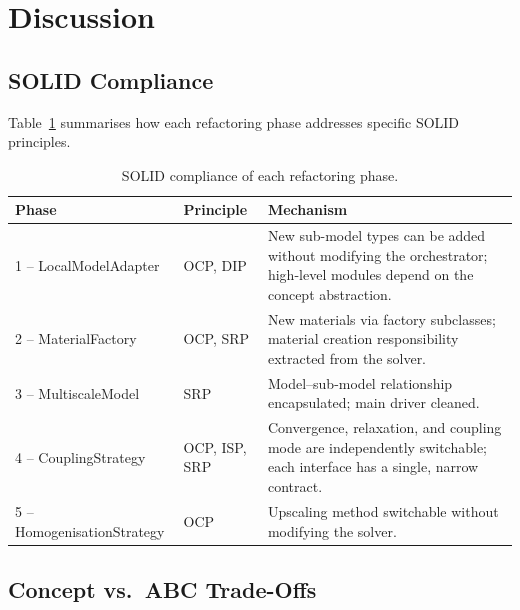 \section{Discussion}
\label{sec:refactor-discussion}

\subsection{SOLID Compliance}
\label{sec:refactor-solid}

Table~\ref{tab:solid-compliance} summarises how each refactoring
phase addresses specific SOLID principles.

\begin{table}[htbp]
  \centering
  \caption{SOLID compliance of each refactoring phase.}
  \label{tab:solid-compliance}
  \small
  \begin{tabular}{@{}llp{7cm}@{}}
    \toprule
    \textbf{Phase} & \textbf{Principle} & \textbf{Mechanism} \\
    \midrule
    1 -- LocalModelAdapter &
      OCP, DIP &
      New sub-model types can be added without modifying the
      orchestrator; high-level modules depend on the concept
      abstraction. \\[4pt]
    2 -- MaterialFactory &
      OCP, SRP &
      New materials via factory subclasses; material creation
      responsibility extracted from the solver. \\[4pt]
    3 -- MultiscaleModel &
      SRP &
      Model--sub-model relationship encapsulated; main driver cleaned. \\[4pt]
    4 -- CouplingStrategy &
      OCP, ISP, SRP &
      Convergence, relaxation, and coupling mode are independently
      switchable; each interface has a single, narrow contract. \\[4pt]
    5 -- HomogenisationStrategy &
      OCP &
      Upscaling method switchable without modifying the solver. \\
    \bottomrule
  \end{tabular}
\end{table}

\subsection{Concept vs.\ ABC Trade-Offs}
\label{sec:refactor-concept-vs-abc}


